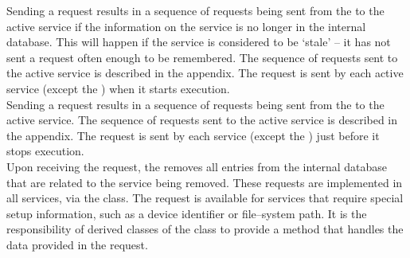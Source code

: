 Sending a  request results in a
sequence of requests being sent from the 
to the active service if the information on the service is no longer in the internal
database.
This will happen if the service is considered to be `stale' -- it has not sent a
 request often enough to be
remembered.
The sequence of requests sent to the active service is described in the 
 appendix.
The  request is sent by each
active service (except the ) when it
starts execution.\\

Sending a  request results in a
sequence of requests being sent from the 
to the active service.
The sequence of requests sent to the active service is described in the 
 appendix.
The  request is sent by each
service (except the ) just before it stops
execution.\\

Upon receiving the  request,
the  removes all entries from the internal
database that are related to the service being removed.
\secondaryEnd{}
These requests are implemented in all \mplusm{}  services, via the
 class.
The  request is available for
 services that require special setup information, such as a device
identifier or file--system path.
It is the responsibility of derived classes of the
 class to provide a method
that handles the data provided in the
 request.\\

